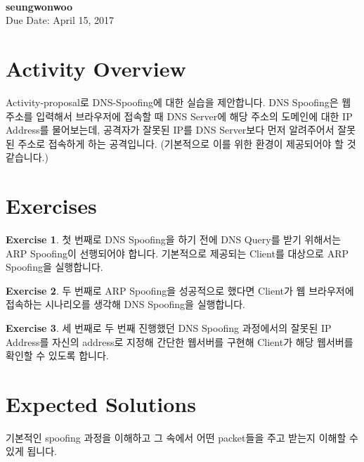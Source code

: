 \documentclass[a4paper, 11pt]{article}
\theoremstyle{definition}
\newtheorem{exercise}{Exercise}
\begin{document}
 \\
         {\phantom{} \hfill \textbf{seungwonwoo}} \\
         {\phantom{} \hfill Due Date: April 15, 2017} \\

\section{Activity Overview}

Activity-proposal로 DNS-Spoofing에 대한 실습을 제안합니다. DNS Spoofing은 웹 주소를 입력해서 브라우저에 접속할 때 DNS Server에 해당 주소의 도메인에 대한 IP Address를 물어보는데, 공격자가 잘못된 IP를 DNS Server보다 먼저 알려주어서 잘못된 주소로 접속하게 하는 공격입니다. (기본적으로 이를 위한 환경이 제공되어야 할 것 같습니다.)

\section{Exercises}

\begin{exercise}

  첫 번째로 DNS Spoofing을 하기 전에 DNS Query를 받기 위해서는 ARP Spoofing이 선행되어야 합니다. 기본적으로 제공되는 Client를 대상으로 ARP Spoofing을 실행합니다.

\end{exercise}

\begin{exercise}

  두 번째로 ARP Spoofing을 성공적으로 했다면 Client가 웹 브라우저에 접속하는 시나리오를 생각해 DNS Spoofing을 실행합니다.

\end{exercise}

\begin{exercise}

  세 번째로 두 번째 진행했던 DNS Spoofing 과정에서의 잘못된 IP Address를 자신의 address로 지정해 간단한 웹서버를 구현해 Client가 해당 웹서버를 확인할 수 있도록 합니다.

\end{exercise}

\section{Expected Solutions}

  기본적인 spoofing 과정을 이해하고 그 속에서 어떤 packet들을 주고 받는지 이해할 수 있게 됩니다.
\end{document}
